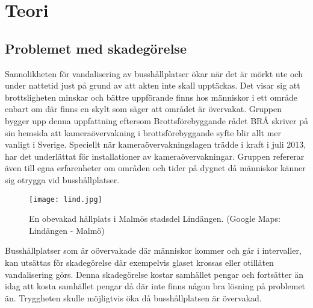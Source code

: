 
\chapter{Teori} %
\label{teori}

\ifpdf
    \graphicspath{{3_theory/figures/PNG/}{3/figures/PDF/}{3/figures/}}
\else
    \graphicspath{{3_theory/figures/EPS/}{3/figures/}}
\fi

\graphicspath{{3_theory/figures/}{3/figures/}}


\section{Problemet med skadegörelse}

Sannolikheten för vandalisering av busshållplatser ökar när det är mörkt ute och under nattetid just på grund av att akten inte skall upptäckas. Det visar sig att brottsligheten minskar och bättre uppförande finns hos människor i ett område enbart om där finns en skylt som säger att området är övervakat. Gruppen bygger upp denna uppfattning eftersom Brottsförebyggande rådet BRÅ skriver på sin hemsida \cite{bra} att kameraövervakning i brottsförebyggande syfte blir allt mer vanligt i Sverige. Speciellt när kameraövervakningslagen trädde i kraft i juli 2013, har det underlättat för installationer av kameraövervakningar. Gruppen refererar även till egna erfarenheter om områden och tider på dygnet då människor känner sig otrygga vid busshållplatser. 

\begin{figure}[h]
  \texttt{[image: lind.jpg]}
  \caption{En obevakad hållplats i Malmös stadsdel Lindängen. (Google Maps: Lindängen - Malmö)}
  \label{fig:lind}
\end{figure}

Busshållplatser som är oövervakade där människor kommer och går i intervaller, kan utsättas för skadegörelse där exempelvis glaset krossas eller otillåten vandalisering görs. Denna skadegörelse kostar samhället pengar och fortsätter än idag att kosta samhället pengar då där inte finns någon bra lösning på problemet än. Tryggheten skulle möjligtvis öka då busshållplatsen är övervakad.\\



